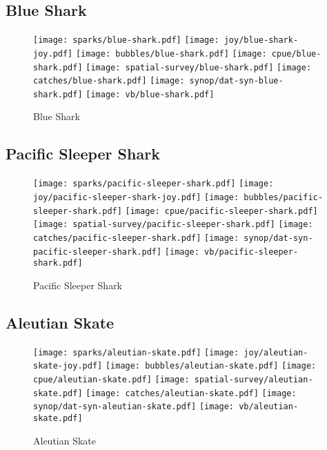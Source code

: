 \subsection*{Blue Shark}

\begin{figure}[htbp]
\centering
\texttt{[image: sparks/blue-shark.pdf]}
\texttt{[image: joy/blue-shark-joy.pdf]}
\texttt{[image: bubbles/blue-shark.pdf]}
\texttt{[image: cpue/blue-shark.pdf]}
\texttt{[image: spatial-survey/blue-shark.pdf]}
\texttt{[image: catches/blue-shark.pdf]}
\texttt{[image: synop/dat-syn-blue-shark.pdf]}
\texttt{[image: vb/blue-shark.pdf]}
\caption{Blue Shark}
\end{figure}
\clearpage
\subsection*{Pacific Sleeper Shark}

\begin{figure}[htbp]
\centering
\texttt{[image: sparks/pacific-sleeper-shark.pdf]}
\texttt{[image: joy/pacific-sleeper-shark-joy.pdf]}
\texttt{[image: bubbles/pacific-sleeper-shark.pdf]}
\texttt{[image: cpue/pacific-sleeper-shark.pdf]}
\texttt{[image: spatial-survey/pacific-sleeper-shark.pdf]}
\texttt{[image: catches/pacific-sleeper-shark.pdf]}
\texttt{[image: synop/dat-syn-pacific-sleeper-shark.pdf]}
\texttt{[image: vb/pacific-sleeper-shark.pdf]}
\caption{Pacific Sleeper Shark}
\end{figure}
\clearpage
\subsection*{Aleutian Skate}

\begin{figure}[htbp]
\centering
\texttt{[image: sparks/aleutian-skate.pdf]}
\texttt{[image: joy/aleutian-skate-joy.pdf]}
\texttt{[image: bubbles/aleutian-skate.pdf]}
\texttt{[image: cpue/aleutian-skate.pdf]}
\texttt{[image: spatial-survey/aleutian-skate.pdf]}
\texttt{[image: catches/aleutian-skate.pdf]}
\texttt{[image: synop/dat-syn-aleutian-skate.pdf]}
\texttt{[image: vb/aleutian-skate.pdf]}
\caption{Aleutian Skate}
\end{figure}
\clearpage
